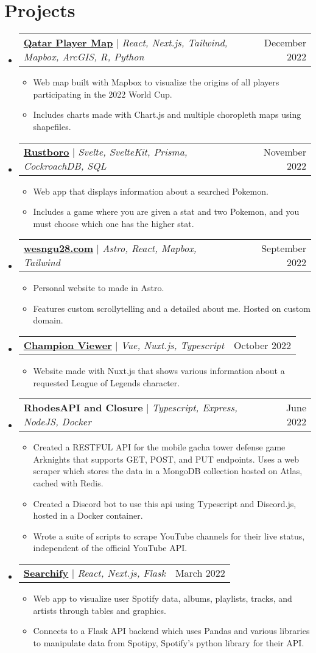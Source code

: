 \documentclass[letterpaper,11pt]{article}
\makeatletter
\newcommand{\resumeItem}[1]{
  \item\small{
    {#1 \vspace{-2pt}}
  }
}
\newcommand{\resumeProjectHeading}[2]{
    \item
    \begin{tabular*}{0.97\textwidth}{l@{\extracolsep{\fill}}r}
      \small#1 & #2 \\
    \end{tabular*}\vspace{-7pt}
}
\newcommand{\resumeSubHeadingListStart}{\begin{itemize}[leftmargin=0.15in, label={}]}
\newcommand{\resumeSubHeadingListEnd}{\end{itemize}}
\newcommand{\resumeItemListStart}{\begin{itemize}}
\newcommand{\resumeItemListEnd}{\end{itemize}\vspace{-5pt}}
\makeatother
\begin{document}
\section{Projects}
    \vspace{-5pt}
    \resumeSubHeadingListStart
        \resumeProjectHeading
          {\textbf{\href{https://qatarwcplayers.vercel.app/}{Qatar Player Map}} $|$ \emph{React, Next.js, Tailwind, Mapbox, ArcGIS, R, Python}}{December 2022}
          \resumeItemListStart
            \resumeItem{Web map built with Mapbox to visualize the origins of all players participating in the 2022 World Cup.}
            \resumeItem{Includes charts made with Chart.js and multiple choropleth maps using shapefiles.}
          \resumeItemListEnd
      \resumeProjectHeading
          {\textbf{\href{https://rustboro.vercel.app/}{Rustboro}} $|$ \emph{Svelte, SvelteKit, Prisma, CockroachDB, SQL}}{November 2022}
          \resumeItemListStart
            \resumeItem{Web app that displays information about a searched Pokemon.}
            \resumeItem{Includes a game where you are given a stat and two Pokemon, and you must choose which one has the higher stat.}
          \resumeItemListEnd
      \resumeProjectHeading
          {\textbf{\href{https://wesngu28.com}{wesngu28.com}} $|$ \emph{Astro, React, Mapbox, Tailwind}}{September 2022}
          \resumeItemListStart
            \resumeItem{Personal website to made in Astro.}
            \resumeItem{Features custom scrollytelling and a detailed about me. Hosted on custom domain.}
          \resumeItemListEnd
      \resumeProjectHeading
          {\textbf{\href{https://simplechampview.vercel.app//}{Champion Viewer}} $|$ \emph{Vue, Nuxt.js, Typescript}}{October 2022}
          \resumeItemListStart
            \resumeItem{Website made with Nuxt.js that shows various information about a requested League of Legends character.}
          \resumeItemListEnd
        \resumeProjectHeading
          {\textbf{RhodesAPI and Closure} $|$ \emph{Typescript, Express, NodeJS, Docker}}{June 2022}
          \resumeItemListStart
            \resumeItem{Created a RESTFUL API for the mobile gacha tower defense game Arknights that supports GET, POST, and PUT endpoints. Uses a web scraper which stores the data in a MongoDB collection hosted on Atlas, cached with Redis.}
            \resumeItem{Created a Discord bot to use this api using Typescript and Discord.js, hosted in a Docker container.}
            \resumeItem{Wrote a suite of scripts to scrape YouTube channels for their live status, independent of the official YouTube API.}
          \resumeItemListEnd
      \resumeProjectHeading
          {\textbf{\href{https://searchifyy.vercel.app/}{Searchify}} $|$ \emph{React, Next.js, Flask}}{March 2022}
          \resumeItemListStart
            \resumeItem{Web app to visualize user Spotify data, albums, playlists, tracks, and artists through tables and graphics.}
            \resumeItem{Connects to a Flask API backend which uses Pandas and various libraries to manipulate data from Spotipy, Spotify's python library for their API.}
          \resumeItemListEnd
    \resumeSubHeadingListEnd
\vspace{-15pt}
\end{document}
